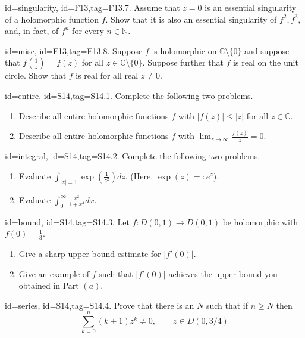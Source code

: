 \documentclass[12pt,letterpaper]{article}
\begin{document}
{\item[id=singularity, id=F13,tag=F13.7.]
Assume that $z = 0$ is an essential singularity of a holomorphic function $f$. Show that it is also an essential singularity of $f^2, f^3$, and, in fact, of $f^n$ for every $n \in \mathbb{N}$.

\item[id=misc, id=F13,tag=F13.8.]
Suppose $f$ is holomorphic on $\mathbb{C} \setminus \{0\}$ and suppose that $f\left(\frac{1}{z}\right) = f(z)$ for all $z \in \mathbb{C} \setminus \{0\}$. Suppose further that $f$ is real on the unit circle. Show that $f$ is real for all real $z \ne 0$.


\item[id=entire, id=S14,tag=S14.1.]
Complete the following two problems.
\begin{enumerate}[label=(\alph*)]\onlyitems
\item Describe all entire holomorphic functions $f$ with $| f(z) | \le | z |$ for all $z \in \mathbb{C}$.
\item Describe all entire holomorphic functions $f$ with $\lim_{z\rightarrow \infty} \frac{f(z)}{z} = 0$.
\end{enumerate}

\item[id=integral, id=S14,tag=S14.2.]
Complete the following two problems.
\begin{enumerate}[label=(\alph*)]\onlyitems
\item Evaluate $\int_{| z | = 1} \exp\left(\frac{1}{z^2}\right) dz$. (Here, $\exp(z) =: e^z$).
\item Evaluate $\int_{0}^{\infty} \frac{x^2}{1+x^4} dx$.
\end{enumerate}
\item[id=bound, id=S14,tag=S14.3.]
Let $f : D(0,1) \rightarrow D(0,1)$ be holomorphic with $f(0) = \frac{1}{3}$.
\begin{enumerate}[label=(\alph*)]\onlyitems
\item Give a sharp upper bound estimate for $| f'(0) |$.
\item Give an example of $f$ such that $| f'(0) |$ achieves the upper bound you obtained in Part $(a)$.
\end{enumerate}

\item[id=series, id=S14,tag=S14.4.]
Prove that there is an $N$ such that if $n \ge N$ then
\[
	\sum_{k=0}^{n} (k+1) z^k \ne 0, \qquad z \in D(0,3/4)
\]

}
\end{document}
